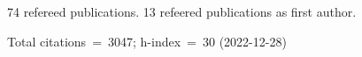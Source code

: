 74 refereed publications. 13 refeered publications as first author.

Total citations~=~3047; h-index~=~30 (2022-12-28)